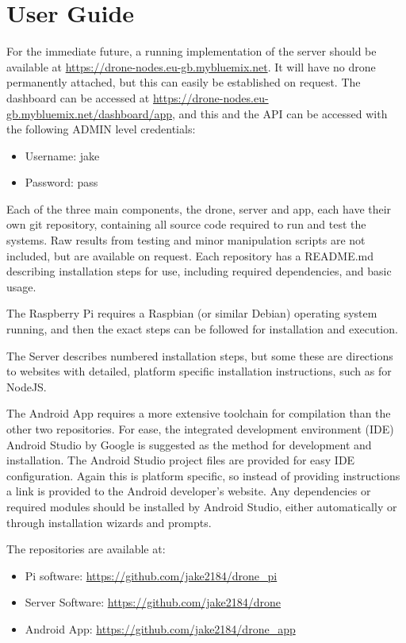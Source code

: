 \documentclass{article}
\begin{document}
\section{User Guide}\label{UserGuide}
For the immediate future, a running implementation of the server should be available at \url{https://drone-nodes.eu-gb.mybluemix.net}. It will have no drone permanently attached, but this can easily be established on request. The dashboard can be accessed at \url{https://drone-nodes.eu-gb.mybluemix.net/dashboard/app}, and this and the API can be accessed with the following ADMIN level credentials:
\begin{itemize}
	\item Username: jake
	\item Password: pass
\end{itemize} 

Each of the three main components, the drone, server and app, each have their own git repository, containing all source code required to run and test the systems. Raw results from testing and minor manipulation scripts are not included, but are available on request. Each repository has a README.md describing installation steps for use, including required dependencies, and basic usage. 

The Raspberry Pi requires a Raspbian (or similar Debian) operating system running, and then the exact steps can be followed for installation and execution.

The Server describes numbered installation steps, but some these are directions to websites with detailed, platform specific installation instructions, such as for NodeJS.

The Android App requires a more extensive toolchain for compilation than the other two repositories. For ease, the integrated development environment (IDE) Android Studio by Google is suggested as the method for development and installation. The Android Studio project files are provided for easy IDE configuration. Again this is platform specific, so instead of providing instructions a link is provided to the Android developer's website. Any dependencies or required modules should be installed by Android Studio, either automatically or through installation wizards and prompts. 


The repositories are available at: 
\begin{itemize}
	\item Pi software: \url{https://github.com/jake2184/drone_pi}
	\item Server Software: \url{https://github.com/jake2184/drone}
	\item Android App: \url{https://github.com/jake2184/drone_app}
\end{itemize}
\end{document}
